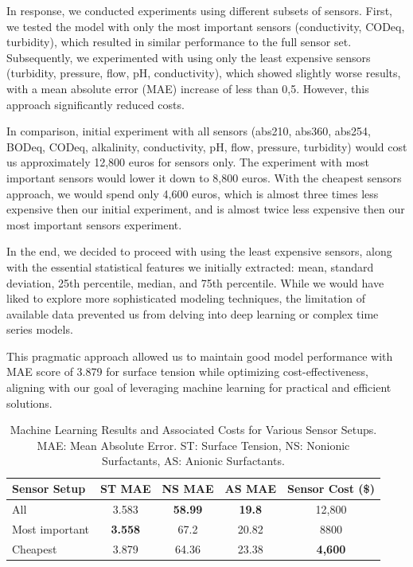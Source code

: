 \documentclass{report}
\begin{document}
In response, we conducted experiments using different subsets of sensors. First, we tested the model with only the most important sensors (conductivity, CODeq, turbidity), which resulted in similar performance to the full sensor set. Subsequently, we experimented with using only the least expensive sensors (turbidity, pressure, flow, pH, conductivity), which showed slightly worse results, with a mean absolute error (MAE) increase of less than 0,5. However, this approach significantly reduced costs. 

In comparison, initial experiment with all sensors (abs210, abs360, abs254, BODeq, CODeq, alkalinity, conductivity, pH, flow, pressure, turbidity) would cost us approximately 12,800 euros for sensors only. The experiment with most important sensors would lower it down to 8,800 euros. With the cheapest sensors approach, we would spend only 4,600 euros, which is almost three times less expensive then our initial experiment, and is almost twice less expensive then our most important sensors experiment. 

In the end, we decided to proceed with using the least expensive sensors, along with the essential statistical features we initially extracted: mean, standard deviation, 25th percentile, median, and 75th percentile. While we would have liked to explore more sophisticated modeling techniques, the limitation of available data prevented us from delving into deep learning or complex time series models.

This pragmatic approach allowed us to maintain good model performance with MAE score of 3.879 for surface tension while optimizing cost-effectiveness, aligning with our goal of leveraging machine learning for practical and efficient solutions.

\begin{table}[h]
    \centering
    \label{tab:ml_results}
    \begin{tabular}{lcccc}
        \toprule
        \textbf{Sensor Setup} & \textbf{ST MAE} & \textbf{NS MAE} & \textbf{AS MAE} & \textbf{Sensor Cost (\$)} \\
        \midrule
        All & 3.583 & \textbf{58.99} & \textbf{19.8} & 12,800 \\
        Most important & \textbf{3.558} & 67.2 & 20.82 & 8800 \\
        Cheapest & 3.879 & 64.36 & 23.38 & \textbf{4,600} \\
        \bottomrule
    \end{tabular}
    \caption{Machine Learning Results and Associated Costs for Various Sensor Setups. MAE: Mean Absolute Error. ST: Surface Tension, NS: Nonionic Surfactants, AS: Anionic Surfactants.}
\end{table}
\end{document}
